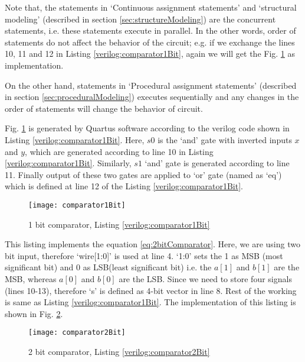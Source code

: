 \begin{noNumBox}
	Note that, the statements in `Continuous assignment statements' and `structural modeling' (described in section \ref{sec:structureModeling}) are the concurrent statements, i.e. these statements execute in parallel. In the other words, order of statements do not affect the behavior of the circuit; e.g. if we exchange the lines 10, 11 and 12 in Listing \ref{verilog:comparator1Bit}, again we will get the Fig. \ref{fig:comparator1Bit} as implementation. 
	
	On the other hand, statements in `Procedural assignment statements' (described in section \ref{sec:proceduralModeling}) executes sequentially and any changes in the order of statements will change the behavior of circuit. 
\end{noNumBox}
%
\begin{explanation}
	Fig. \ref{fig:comparator1Bit} is generated by Quartus software according to the verilog code shown in Listing \ref{verilog:comparator1Bit}. Here, $s0$ is the `and' gate with inverted inputs $x$ and $y$, which are generated according to line 10 in Listing \ref{verilog:comparator1Bit}. Similarly,  $s1$ `and' gate is generated according to line 11. Finally output of these two gates are applied to `or' gate (named as `eq') which is defined at line 12 of the Listing \ref{verilog:comparator1Bit}.   
\end{explanation}
\begin{figure}[!h]
	\centering
	\texttt{[image: comparator1Bit]}
	\caption{ 1 bit comparator, Listing \ref{verilog:comparator1Bit}}
	\label{fig:comparator1Bit}
\end{figure}
%
\begin{explanation} 
	This listing implements the equation \ref{eq:2bitComparator}. Here, we are using two bit input, therefore `wire[1:0]' is used at line 4. `1:0' sets the 1 as MSB (most significant bit) and 0 as LSB(least significant bit) i.e. the $a[1]$ and $b[1]$ are the MSB, whereas $a[0]$ and $b[0]$ are the LSB. Since we need to store four signals (lines 10-13), therefore `s' is defined as 4-bit vector in line 8. Rest of the working is same as Listing \ref{verilog:comparator1Bit}. The implementation of this listing is shown in Fig. \ref{fig:comparator2Bit}. 
\end{explanation}

\begin{figure}[!h]
	\centering
	\texttt{[image: comparator2Bit]}
	\caption{2 bit comparator, Listing \ref{verilog:comparator2Bit}}
	\label{fig:comparator2Bit}
\end{figure}
%


